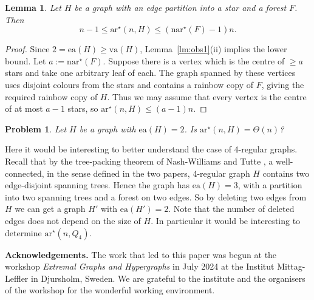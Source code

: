 \documentclass[a4paper, 12pt]{article}
\numberwithin{equation}{section}
\newtheorem{problem}[theorem]{Problem}
\newtheorem{lemma}[theorem]{Lemma}
\def\sar{{\mathrm{ar}^{\star}}}
\def\ea{{\mathrm{ea}}}
\def\va{{\mathrm{va}}}
\def\nsar{{\mathrm{n}\sar}}
\begin{document}
\begin{lemma}\label{lm:star}
Let $H$ be a graph with an edge partition into a star and a forest $F$. Then
$$
n-1 \leq \sar(n,H) \leq (\nsar(F)-1)n.
$$
\end{lemma}

\begin{proof}
Since $2=\ea(H) \geq \va(H)$, Lemma~\ref{lm:obs1}(ii) implies the lower bound.
Let $a := \nsar(F)$.
Suppose there is a vertex which is the centre of $\geq a$ stars and take one arbitrary leaf of each. The graph spanned by these vertices uses disjoint colours from the stars and contains a rainbow copy of $F$, giving the required rainbow copy of $H$.
Thus we may assume that every vertex is the centre of at most $a-1$ stars, so $\sar(n,H) \leq (a-1)n$.
\end{proof}


\begin{problem}\label{prob:ea}
    Let $H$ be a graph with $\ea(H)=2$. Is $\sar(n,H) = \Theta(n)$?
\end{problem}
Here it would be interesting to better understand the case of 4-regular graphs. Recall that by the tree-packing theorem of Nash-Williams \cite{NW61} and Tutte \cite{Tu61}, a well-connected, in the sense defined in the two papers,  
4-regular graph $H$ contains two edge-disjoint spanning trees. Hence the graph has $\ea(H)=3$, with a partition into  two spanning trees and a forest on two edges.   So by deleting two edges from $H$ we can get a graph $H'$  with $\ea(H')=2$. Note that the number of deleted edges does not depend on the size of $H$.  In particular it would be interesting to determine $\sar(n,Q_4)$.

\medskip
\noindent
\textbf{Acknowledgements.}
The work that led to this paper was begun at the workshop \emph{Extremal Graphs and Hypergraphs} in July 2024 at the Institut Mittag-Leffler in Djursholm, Sweden. We are grateful to the institute and the organisers of the workshop for the wonderful working environment.





\end{document}
